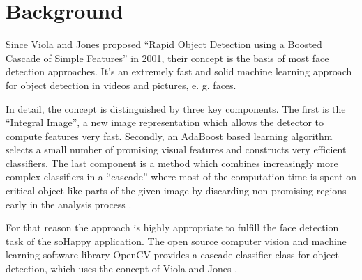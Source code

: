 \section{Background} \label{sec:background}
Since Viola and Jones proposed ``Rapid Object Detection using a Boosted Cascade of Simple Features'' in 2001, their concept is the basis of most face detection approaches.
It's an extremely fast and solid machine learning approach for object detection in videos and pictures, e. g. faces.

In detail, the concept is distinguished by three key components.
The first is the ``Integral Image'', a new image representation which allows the detector to compute features very fast.
Secondly, an AdaBoost based learning algorithm selects a small number of promising visual features and constructs very efficient classifiers.
The last component is a method which combines increasingly more complex classifiers in a ``cascade'' where most of the computation time is spent on critical object-like parts of the given image by discarding non-promising regions early in the analysis process \cite{viola_jones}.

For that reason the approach is highly appropriate to fulfill the face detection task of the soHappy application.
The open source computer vision and machine learning software library OpenCV provides a cascade classifier class for object detection, which uses the concept of Viola and Jones \cite{opencv_cascade_classifier}.

